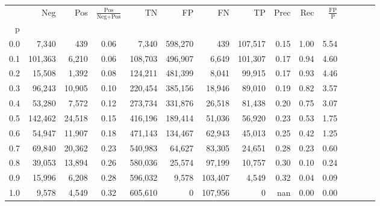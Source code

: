 \begin{tabular}{rrrcrrrrrrrrrrr}
\toprule
{} &      Neg &     Pos & $\frac{\text{Pos}}{\text{Neg}+\text{Pos}}$ &       TN &       FP &       FN &       TP &  Prec &   Rec & $\frac{\text{FP}}{\text{P}}$ \\
p   &          &         &                                            &          &          &          &          &       &       &                              \\
\midrule
0.0 &    7,340 &     439 &                                       0.06 &    7,340 &  598,270 &      439 &  107,517 &  0.15 &  1.00 &                         5.54 \\
0.1 &  101,363 &   6,210 &                                       0.06 &  108,703 &  496,907 &    6,649 &  101,307 &  0.17 &  0.94 &                         4.60 \\
0.2 &   15,508 &   1,392 &                                       0.08 &  124,211 &  481,399 &    8,041 &   99,915 &  0.17 &  0.93 &                         4.46 \\
0.3 &   96,243 &  10,905 &                                       0.10 &  220,454 &  385,156 &   18,946 &   89,010 &  0.19 &  0.82 &                         3.57 \\
0.4 &   53,280 &   7,572 &                                       0.12 &  273,734 &  331,876 &   26,518 &   81,438 &  0.20 &  0.75 &                         3.07 \\
0.5 &  142,462 &  24,518 &                                       0.15 &  416,196 &  189,414 &   51,036 &   56,920 &  0.23 &  0.53 &                         1.75 \\
0.6 &   54,947 &  11,907 &                                       0.18 &  471,143 &  134,467 &   62,943 &   45,013 &  0.25 &  0.42 &                         1.25 \\
0.7 &   69,840 &  20,362 &                                       0.23 &  540,983 &   64,627 &   83,305 &   24,651 &  0.28 &  0.23 &                         0.60 \\
0.8 &   39,053 &  13,894 &                                       0.26 &  580,036 &   25,574 &   97,199 &   10,757 &  0.30 &  0.10 &                         0.24 \\
0.9 &   15,996 &   6,208 &                                       0.28 &  596,032 &    9,578 &  103,407 &    4,549 &  0.32 &  0.04 &                         0.09 \\
1.0 &    9,578 &   4,549 &                                       0.32 &  605,610 &        0 &  107,956 &        0 &   nan &  0.00 &                         0.00 \\
\bottomrule
\end{tabular}
